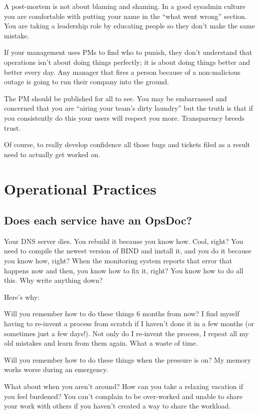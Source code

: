 \documentclass{article}
\begin{document}
A post-mortem is not about blaming and shaming. In a good sysadmin culture you are comfortable with putting your name in the ``what went wrong'' section. You are taking a leadership role by educating people so they don't make the same mistake.

If your management uses PMs to find who to punish, they don't understand that operations isn't about doing things perfectly; it is about doing things better and better every day. Any manager that fires a person because of a non-malicious outage is going to run their company into the ground.

The PM should be published for all to see. You may be embarrassed and concerned that you are ``airing your team's dirty laundry'' but the truth is that if you consistently do this your users will respect you more. Transparency breeds trust.

Of course, to really develop confidence all those bugs and tickets filed as a result need to actually get worked on.

\section{Operational Practices}
\subsection{Does each service have an OpsDoc? \Checkmark}
Your DNS server dies. You rebuild it because you know how. Cool, right? You need to compile the newest version of BIND and install it, and you do it because you know how, right? When the monitoring system reports that error that happens now and then, you know how to fix it, right? You know how to do all this. Why write anything down?

Here's why:

Will you remember how to do these things 6 months from now? I find myself having to re-invent a process from scratch if I haven't done it in a few months (or sometimes just a few days!). Not only do I re-invent the process, I repeat all my old mistakes and learn from them again. What a waste of time.

Will you remember how to do these things when the pressure is on? My memory works worse during an emergency.

What about when you aren't around? How can you take a relaxing vacation if you feel burdened? You can't complain to be over-worked and unable to share your work with others if you haven't created a way to share the workload.
\end{document}
